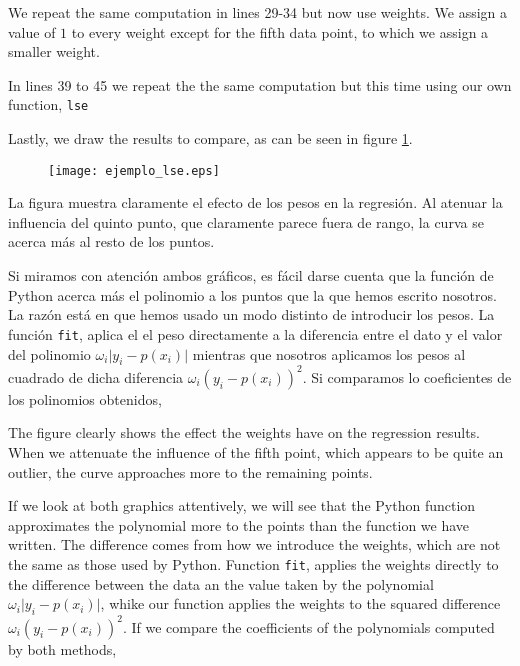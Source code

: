 \begin{paracol}{2}
We repeat the same computation in lines 29-34 but now use weights. We assign a value of $1$ to every weight except for the fifth data point, to which we assign a smaller weight.

In lines 39 to 45 we repeat the the same computation but this time using our own function, \texttt{lse}

Lastly, we draw the results to compare, as can be seen in figure \ref{fig:lse}.
\end{paracol}

\begin{figure}[h]
	\centering
	\texttt{[image: ejemplo\_lse.eps]}
	\label{fig:lse}
\end{figure}


\begin{paracol}{2}
La figura muestra claramente el efecto de los pesos en la regresión. Al atenuar la influencia del quinto punto, que claramente parece fuera de rango, la curva se acerca más al resto de los puntos.

Si miramos con atención ambos gráficos, es fácil darse cuenta que la función de Python acerca más el polinomio a los puntos que la que hemos escrito nosotros. La razón está en que hemos usado un modo distinto de introducir los pesos. La función \texttt{fit}, aplica el el peso directamente a la diferencia entre el dato y el valor del polinomio $\omega_i \vert y_i - p(x_i)\vert$ mientras que nosotros aplicamos los pesos al cuadrado de dicha diferencia $\omega_i(y_i-p(x_i))^2$. Si comparamos lo coeficientes de los polinomios obtenidos,

\switchcolumn
The figure clearly shows the effect the we\-ights have on the regression results. When we attenuate the influence of the fifth point, which appears to be quite an outlier, the curve approaches more to the remaining points.

If we look at both graphics attentively, we will see that the Python function approximates the polynomial more to the points than the function we have written. The difference comes from how we introduce the weights, which are not the same as those used by Python. Function \texttt{fit}, applies the weights directly to the difference between the data an the value taken by the polynomial $\omega_i \vert y_i - p(x_i)\vert$, whike our function applies the weights to the squared difference  $\omega_i(y_i-p(x_i))^2$. If we compare the coefficients of the polynomials computed by both methods,
\end{paracol}


